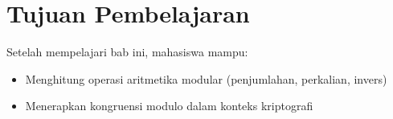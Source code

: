 \section*{Tujuan Pembelajaran}
Setelah mempelajari bab ini, mahasiswa mampu:
\begin{itemize}
\item Menghitung operasi aritmetika modular (penjumlahan, perkalian, invers)
\item Menerapkan kongruensi modulo dalam konteks kriptografi
\end{itemize}
